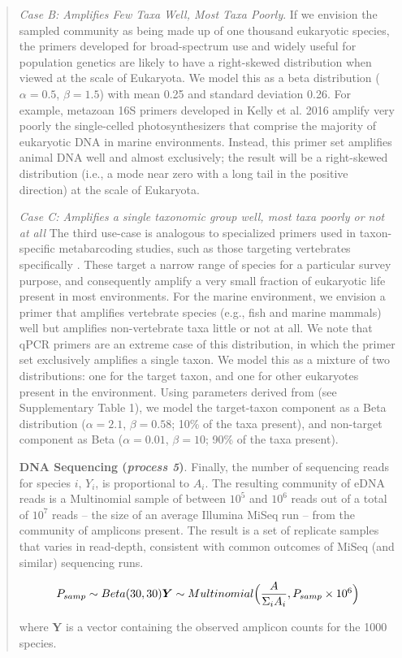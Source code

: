 \documentclass[fleqn,11pt,lineno]{wlscirep}
\begin{document}
\begin{quote}
\textit{Case B: Amplifies Few Taxa Well, Most Taxa Poorly}. 
	If we envision the sampled community as being made up of one thousand eukaryotic species, the primers developed for broad-spectrum use and widely useful for population genetics are likely to have a right-skewed distribution when viewed at the scale of Eukaryota.  We model this as a beta distribution ($\alpha = 0.5$, $\beta = 1.5$) with mean 0.25 and standard deviation 0.26. For example, metazoan 16S primers developed in Kelly et al. 2016 \cite{kelly2016genetic} amplify very poorly the single-celled photosynthesizers that comprise the majority of eukaryotic DNA in marine environments. Instead, this primer set amplifies animal DNA well and almost exclusively; the result will be a right-skewed  distribution (i.e., a mode near zero with a long tail in the positive direction) at the scale of Eukaryota.
	 
\textit{Case C: Amplifies a single taxonomic group well, most taxa poorly or not at all } 
	The third use-case is analogous to specialized primers used in taxon-specific metabarcoding studies, such as those targeting vertebrates specifically \cite{riaz_ecoprimers:_2011, port2016assessing, miya2015mifish, yamamoto2017environmental}. These target a narrow range of species for a particular survey purpose, and consequently amplify a very small fraction of eukaryotic life present in most environments.  For the marine environment, we envision a primer that amplifies vertebrate species (e.g., fish and marine mammals) well but amplifies non-vertebrate taxa little or not at all. We note that qPCR primers are an extreme case of this distribution, in which the primer set exclusively amplifies a single taxon. We model this as a mixture of two distributions: one for the target taxon, and one for other eukaryotes present in the environment. Using parameters derived from \cite{hanfling2016environmental} (see Supplementary Table 1), we model the target-taxon component as a Beta distribution ($\alpha = 2.1$, $\beta = 0.58$; 10\% of the taxa present), and non-target component as Beta ($\alpha = 0.01$, $\beta = 10$; 90\% of the taxa present).	
	
\textbf{DNA Sequencing (\textit{process 5})}.  Finally, the number of sequencing reads for species $i$, $Y_{i}$, is proportional to $A_{i}$. The resulting community of eDNA reads is a Multinomial sample of between $10^5$ and $10^6$ reads out of a total of $10^7$ reads -- the size of an average Illumina MiSeq run -- from the community of amplicons present. The result is a set of replicate samples that varies in read-depth, consistent with common outcomes of MiSeq (and similar) sequencing runs.

\begin{equation}
	$$	P_{samp} \sim Beta(30,30) $$ \\
	$$	\boldsymbol{Y} \sim Multinomial\Big(\dfrac{A}{\Sigma_i A_i},P_{samp}\times10^6 \Big) $$
\end{equation}	

where $\boldsymbol{Y}$ is a vector containing the observed amplicon counts for the 1000 species.
\end{quote}
\end{document}
